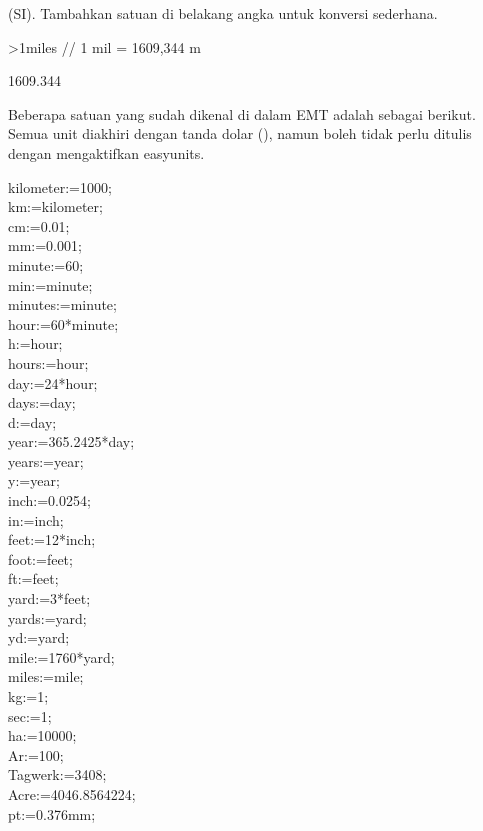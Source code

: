 \documentclass{article}
\begin{document}
\begin{eulernotebook}
\begin{eulercomment}
\begin{eulercomment}
\begin{eulercomment}
(SI). Tambahkan satuan di belakang angka untuk konversi sederhana.
\end{eulercomment}
\begin{eulerprompt}
>1miles  // 1 mil = 1609,344 m
\end{eulerprompt}
\begin{euleroutput}
  1609.344
\end{euleroutput}
\begin{eulercomment}
Beberapa satuan yang sudah dikenal di dalam EMT adalah sebagai
berikut. Semua unit diakhiri dengan tanda dolar (\textdollar{}), namun boleh tidak
perlu ditulis dengan mengaktifkan easyunits. 

kilometer\textdollar{}:=1000;\\
km\textdollar{}:=kilometer\textdollar{};\\
cm\textdollar{}:=0.01;\\
mm\textdollar{}:=0.001;\\
minute\textdollar{}:=60;\\
min\textdollar{}:=minute\textdollar{};\\
minutes\textdollar{}:=minute\textdollar{};\\
hour\textdollar{}:=60*minute\textdollar{};\\
h\textdollar{}:=hour\textdollar{};\\
hours\textdollar{}:=hour\textdollar{};\\
day\textdollar{}:=24*hour\textdollar{};\\
days\textdollar{}:=day\textdollar{};\\
d\textdollar{}:=day\textdollar{};\\
year\textdollar{}:=365.2425*day\textdollar{};\\
years\textdollar{}:=year\textdollar{};\\
y\textdollar{}:=year\textdollar{};\\
inch\textdollar{}:=0.0254;\\
in\textdollar{}:=inch\textdollar{};\\
feet\textdollar{}:=12*inch\textdollar{};\\
foot\textdollar{}:=feet\textdollar{};\\
ft\textdollar{}:=feet\textdollar{};\\
yard\textdollar{}:=3*feet\textdollar{};\\
yards\textdollar{}:=yard\textdollar{};\\
yd\textdollar{}:=yard\textdollar{};\\
mile\textdollar{}:=1760*yard\textdollar{};\\
miles\textdollar{}:=mile\textdollar{};\\
kg\textdollar{}:=1;\\
sec\textdollar{}:=1;\\
ha\textdollar{}:=10000;\\
Ar\textdollar{}:=100;\\
Tagwerk\textdollar{}:=3408;\\
Acre\textdollar{}:=4046.8564224;\\
pt\textdollar{}:=0.376mm;


\end{eulercomment}
\end{eulercomment}
\end{eulercomment}
\end{eulernotebook}
\end{document}
